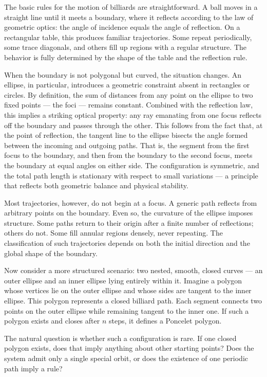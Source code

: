 The basic rules for the motion of billiards are straightforward. A ball moves in a straight line until it meets a boundary, where it reflects according to the law of geometric optics: the angle of incidence equals the angle of reflection. On a rectangular table, this produces familiar trajectories. Some repeat periodically, some trace diagonals, and others fill up regions with a regular structure. The behavior is fully determined by the shape of the table and the reflection rule.

When the boundary is not polygonal but curved, the situation changes. An ellipse, in particular, introduces a geometric constraint absent in rectangles or circles. By definition, the sum of distances from any point on the ellipse to two fixed points — the foci — remains constant. Combined with the reflection law, this implies a striking optical property: any ray emanating from one focus reflects off the boundary and passes through the other. This follows from the fact that, at the point of reflection, the tangent line to the ellipse bisects the angle formed between the incoming and outgoing paths. That is, the segment from the first focus to the boundary, and then from the boundary to the second focus, meets the boundary at equal angles on either side. The configuration is symmetric, and the total path length is stationary with respect to small variations — a principle that reflects both geometric balance and physical stability.

Most trajectories, however, do not begin at a focus. A generic path reflects from arbitrary points on the boundary. Even so, the curvature of the ellipse imposes structure. Some paths return to their origin after a finite number of reflections; others do not. Some fill annular regions densely, never repeating. The classification of such trajectories depends on both the initial direction and the global shape of the boundary.

Now consider a more structured scenario: two nested, smooth, closed curves — an outer ellipse and an inner ellipse lying entirely within it. Imagine a polygon whose vertices lie on the outer ellipse and whose sides are tangent to the inner ellipse. This polygon represents a closed billiard path. Each segment connects two points on the outer ellipse while remaining tangent to the inner one. If such a polygon exists and closes after $n$ steps, it defines a Poncelet polygon.

The natural question is whether such a configuration is rare. If one closed polygon exists, does that imply anything about other starting points? Does the system admit only a single special orbit, or does the existence of one periodic path imply a rule?

